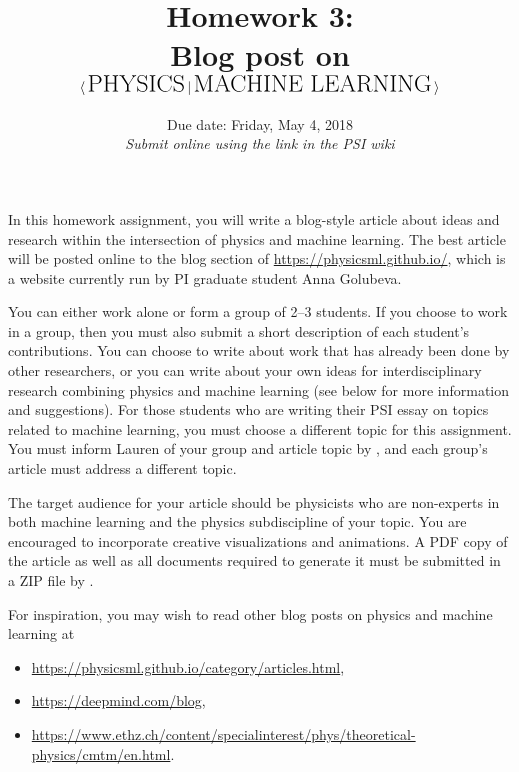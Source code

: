 \documentclass[letterpaper]{scrartcl}
\begin{document}

\vspace{-3cm}

\title{Homework 3: \\ Blog post on
$\langle \, \text{\LARGE PHYSICS} \, \vert \, \text{\LARGE MACHINE LEARNING} \, \rangle$ \vspace*{-6mm}}

\date{Due date: Friday, May 4, 2018 \\ \textit{\normalsize{Submit online using the link in the PSI wiki}}}

\maketitle

In this homework assignment, you will write a blog-style article about ideas and research within the intersection of physics and machine learning.
The best article will be posted online to the blog section of {\small\url{https://physicsml.github.io/}}, 
which is a website currently run by PI graduate student Anna Golubeva.

You can either work alone or form a group of 2--3 students. 
If you choose to work in a group, then you must also submit a short description of each student's contributions.
You can choose to write about work that has already been done by other researchers, 
or you can write about your own ideas for interdisciplinary research combining physics and machine learning
(see below for more information and suggestions).
For those students who are writing their PSI essay on topics related to machine learning, 
you must choose a different topic for this assignment.
You must inform Lauren of your group and article topic by 
\normalfont,
and each group's article must address a different topic.

The target audience for your article should be physicists who are non-experts in 
both machine learning and the physics subdiscipline of your topic.
You are encouraged to incorporate creative visualizations and animations.
A PDF copy of the article as well as all documents required to generate it must be submitted in a ZIP file by
\normalfont.

For inspiration, you may wish to read other blog posts on physics and machine learning at
\vspace*{-1mm}\begin{itemize}[leftmargin=*,labelindent=2mm,itemsep=-1mm,label=$\circ$]
\item {\small\url{https://physicsml.github.io/category/articles.html}}, 
\item {\small\url{https://deepmind.com/blog}},
\item {\small\url{https://www.ethz.ch/content/specialinterest/phys/theoretical-physics/cmtm/en.html}}.
\end{itemize}
\end{document}
